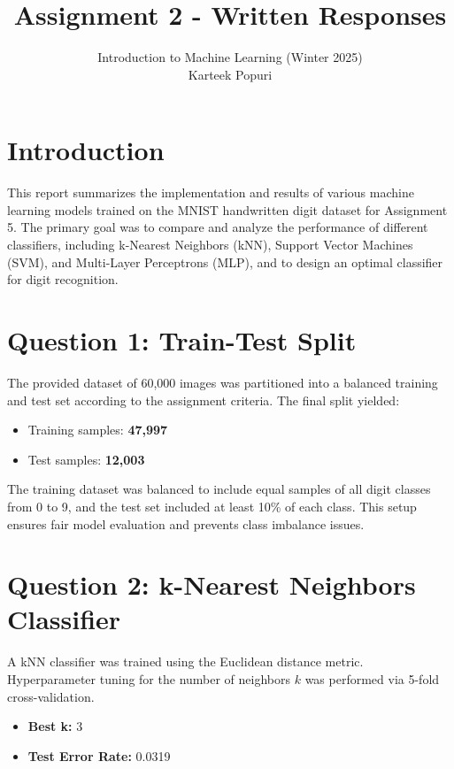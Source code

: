 \documentclass[a4paper,12pt]{article}
\title{Assignment 2 - Written Responses}
\author{Introduction to Machine Learning (Winter 2025)\\ Karteek Popuri}
\date{}
\begin{document}
\maketitle

\section*{Introduction}
This report summarizes the implementation and results of various machine learning models trained on the MNIST handwritten digit dataset for Assignment 5. The primary goal was to compare and analyze the performance of different classifiers, including k-Nearest Neighbors (kNN), Support Vector Machines (SVM), and Multi-Layer Perceptrons (MLP), and to design an optimal classifier for digit recognition.

\section*{Question 1: Train-Test Split}
The provided dataset of 60,000 images was partitioned into a balanced training and test set according to the assignment criteria. The final split yielded:

\begin{itemize}
  \item Training samples: \textbf{47,997}
  \item Test samples: \textbf{12,003}
\end{itemize}

The training dataset was balanced to include equal samples of all digit classes from 0 to 9, and the test set included at least 10\% of each class. This setup ensures fair model evaluation and prevents class imbalance issues.

\section*{Question 2: k-Nearest Neighbors Classifier}
A kNN classifier was trained using the Euclidean distance metric. Hyperparameter tuning for the number of neighbors \(k\) was performed via 5-fold cross-validation.

\begin{itemize}
  \item \textbf{Best k:} 3
  \item \textbf{Test Error Rate:} 0.0319
\end{itemize}
\end{document}
